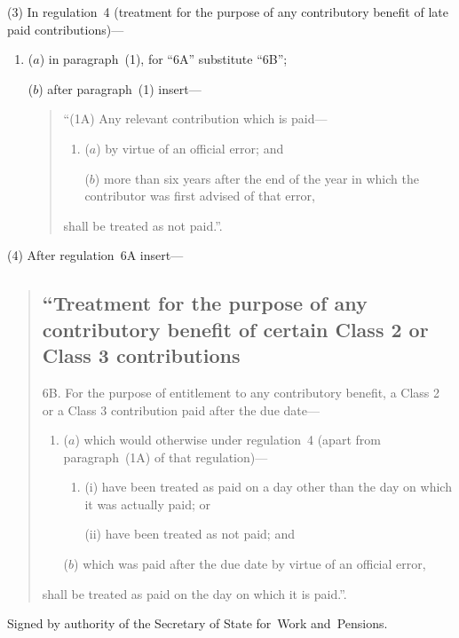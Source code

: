 \documentclass[12pt,a4paper]{article}
\begin{document}
(3) In regulation~4 (treatment for the purpose of any contributory benefit of late paid contributions)—
\begin{enumerate}\item[]
($a$) in paragraph~(1), for “6A” substitute “6B”;

($b$) after paragraph~(1) insert—
\begin{quotation}
“(1A) Any relevant contribution which is paid—
\begin{enumerate}\item[]
($a$) by virtue of an official error; and

($b$) more than six years after the end of the year in which the contributor was first advised of that error,
\end{enumerate}
shall be treated as not paid.”.
\end{quotation}
\end{enumerate}

(4) After regulation~6A insert—
\begin{quotation}
\subsection*{“Treatment for the purpose of any contributory benefit of certain Class 2 or Class 3 contributions}

6B.  For the purpose of entitlement to any contributory benefit, a Class 2 or a Class 3 contribution paid after the due date—
\begin{enumerate}\item[]
($a$) which would otherwise under regulation~4 (apart from paragraph~(1A) of that regulation)—
\begin{enumerate}\item[]
(i) have been treated as paid on a day other than the day on which it was actually paid; or

(ii) have been treated as not paid; and
\end{enumerate}

($b$) which was paid after the due date by virtue of an official error,
\end{enumerate}
shall be treated as paid on the day on which it is paid.”.
\end{quotation}

\pagebreak[3]

\bigskip

Signed 
by authority of the 
Secretary of State for~Work and~Pensions.
\end{document}

